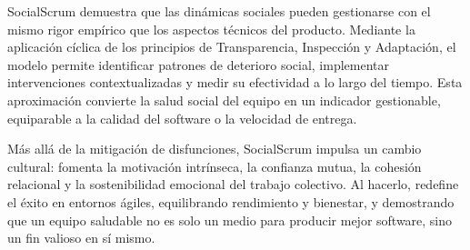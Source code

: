 SocialScrum demuestra que las dinámicas sociales pueden gestionarse con el mismo rigor empírico que los aspectos técnicos del producto.
Mediante la aplicación cíclica de los principios de Transparencia, Inspección y Adaptación, el modelo permite identificar patrones de deterioro social, implementar intervenciones contextualizadas y medir su efectividad a lo largo del tiempo.
Esta aproximación convierte la salud social del equipo en un indicador gestionable, equiparable a la calidad del software o la velocidad de entrega.

Más allá de la mitigación de disfunciones, SocialScrum impulsa un cambio cultural: fomenta la motivación intrínseca, la confianza mutua, la cohesión relacional y la sostenibilidad emocional del trabajo colectivo.
Al hacerlo, redefine el éxito en entornos ágiles, equilibrando rendimiento y bienestar, y demostrando que un equipo saludable no es solo un medio para producir mejor software, sino un fin valioso en sí mismo.

\printglossary[type=\acronymtype, title={Acrónimos}]
\printglossary[style=altlist,title={Glosario}]
